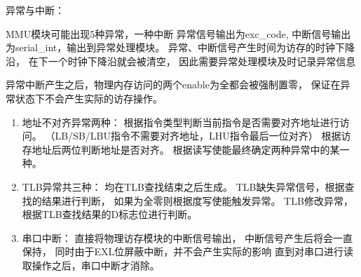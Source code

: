             异常与中断：
            \begin{minipage}[t]{0.8\linewidth}
                MMU模块可能出现5种异常，一种中断%
                异常信号输出为exc\_code, %
                中断信号输出为serial\_int，输出到异常处理模块。%
                异常、中断信号产生时间为访存的时钟下降沿，%
                在下一个时钟下降沿就会被清空，%
                因此需要异常处理模块及时记录异常信息

                异常中断产生之后，物理内存访问的两个enable为全都会被强制置零，%
                保证在异常状态下不会产生实际的访存操作。

                \begin{enumerate}
                \item
                地址不对齐异常两种：%
                    根据指令类型判断当前指令是否需要对齐地址进行访问。%
                    （LB/SB/LBU指令不需要对齐地址，LHU指令最后一位对齐）%
                    根据访存地址后两位判断地址是否对齐。%
                    根据读写使能最终确定两种异常中的某一种。%
                \item
                TLB异常共三种：%
                    均在TLB查找结束之后生成。%
                    TLB缺失异常信号，根据查找的结果进行判断，%
                    如果为全零则根据度写使能触发异常。%
                    TLB修改异常，根据TLB查找结果的D标志位进行判断。%
                \item
                串口中断：%
                    直接将物理访存模块的中断信号输出，%
                    中断信号产生后将会一直保持，%
                    同时由于EXL位屏蔽中断，并不会产生实际的影响%
                    直到对串口进行读取操作之后，串口中断才消除。
                \end{enumerate}
            \end{minipage}
            
